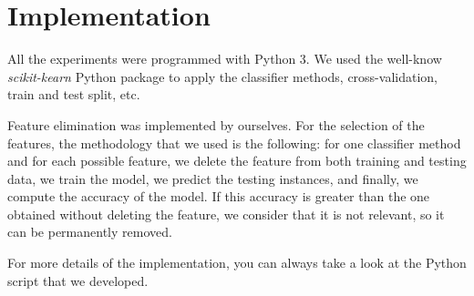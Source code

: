 \section{Implementation}
\label{sec:implementation}

All the experiments were programmed with Python 3. We used the well-know \textit{scikit-kearn} \cite{scikit-learn} Python package to apply the classifier methods, cross-validation, train and test split, etc. 

Feature elimination was implemented by ourselves. For the selection of the features, the methodology that we used is the following: for one classifier method and for each possible feature, we delete the feature from both training and testing data, we train the model, we predict the testing instances, and finally, we compute the accuracy of the model. If this accuracy is greater than the one obtained without deleting the feature, we consider that it is not relevant, so it can be permanently removed.

For more details of the implementation, you can always take a look at the Python script that we developed.